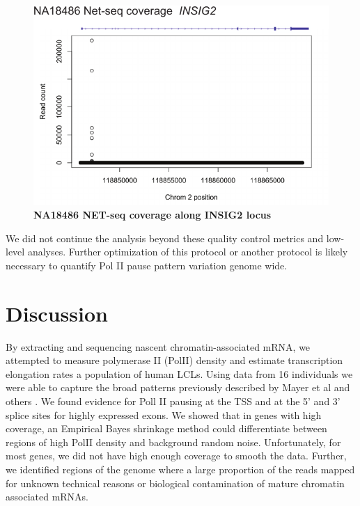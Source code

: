 \begin{figure}
\centering \includegraphics[trim=0 .3in 0
  0,clip,width=5in]{img/ch04/Figure5.pdf}
\caption[NA18486 NET-seq coverage along INSIG2 locus]{\textbf{NA18486 NET-seq coverage along INSIG2 locus}}
\label{fig:insig}
\end{figure}

We did not continue the analysis beyond these quality control metrics and low-level analyses. Further optimization of this protocol or another protocol is likely necessary to quantify Pol II pause pattern variation genome wide. 



\section{Discussion}\label{ch04-discussion}


By extracting and sequencing nascent chromatin-associated mRNA, we attempted to measure polymerase II (PolII) density and estimate transcription elongation rates a population of human LCLs. Using data from 16 individuals we were able to capture the broad patterns previously described by Mayer et al and others \cite{mayer_native_2015}. We found evidence for Poll II pausing at the TSS and at the 5' and 3' splice sites for highly expressed exons. We showed that in genes with high coverage, an Empirical Bayes shrinkage method could differentiate between regions of high PolII density and background random noise. Unfortunately, for most genes, we did not have high enough coverage to smooth the data. Further, we identified regions of the genome where a large proportion of the reads mapped for unknown technical reasons or biological contamination of mature chromatin associated mRNAs.

